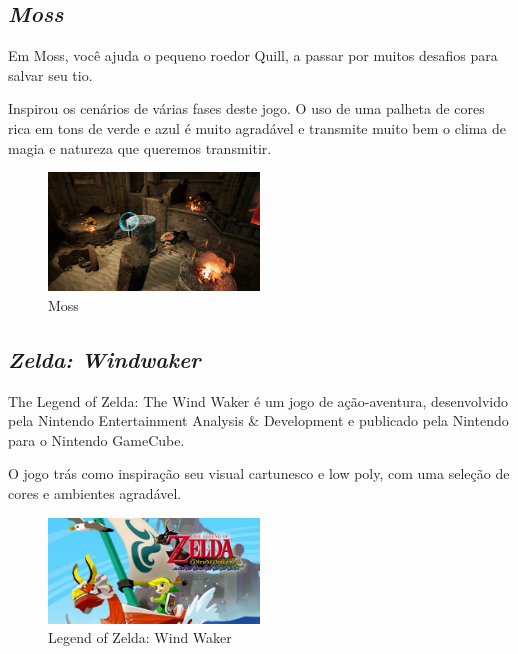\subsection{\textit{Moss}}
Em Moss, você ajuda o pequeno roedor Quill, a passar por muitos desafios para salvar seu tio. \cite{Moss18}

Inspirou os cenários de várias fases deste jogo. O uso de uma palheta de cores rica em tons de verde e azul é muito agradável e transmite muito bem o clima de magia e natureza que queremos transmitir. 

\begin{figure}[!htb] \caption{\label{fig_moss}Moss} \begin{center}
\includegraphics[width=0.5\textwidth]{imagens/moss.jpg} \end{center}
 \end{figure}


\subsection{\textit{Zelda: Windwaker}}
The Legend of Zelda: The Wind Waker é um jogo de ação-aventura, desenvolvido pela Nintendo Entertainment Analysis \& Development e publicado pela Nintendo para o Nintendo GameCube.

O jogo trás como inspiração seu visual cartunesco e low poly, com uma seleção de cores e ambientes agradável.

\begin{figure}[!htb] \caption{\label{fig_zelda}Legend of Zelda: Wind Waker} \begin{center}
\includegraphics[width=0.5\textwidth]{imagens/windwaker.jpeg} \end{center}
 \end{figure}

